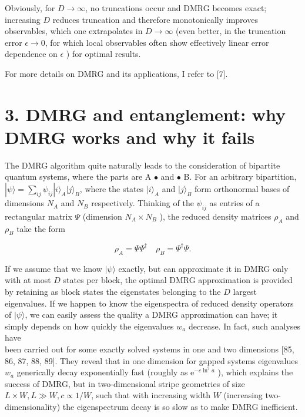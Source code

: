 \documentclass[12pt]{article}
\begin{document}
Obviously, for $D \rightarrow \infty$, no truncations occur and DMRG becomes exact; increasing $D$ reduces truncation and therefore monotonically improves observables, which one extrapolates in $D \rightarrow \infty$ (even better, in the truncation error $\epsilon \rightarrow 0$, for which local observables often show effectively linear error dependence on $\epsilon$ ) for optimal results.

For more details on DMRG and its applications, I refer to [7].

\section*{3. DMRG and entanglement: why DMRG works and why it fails}
The DMRG algorithm quite naturally leads to the consideration of bipartite quantum systems, where the parts are A $\bullet$ and $\bullet$ B. For an arbitrary bipartition, $|\psi\rangle=\sum_{i j} \psi_{i j}|i\rangle_{A}|j\rangle_{B}$, where the states $|i\rangle_{A}$ and $|j\rangle_{B}$ form orthonormal bases of dimensions $N_{A}$ and $N_{B}$ respectively. Thinking of the $\psi_{i j}$ as entries of a rectangular matrix $\Psi$ (dimension $N_{A} \times N_{B}$ ), the reduced density matrices $\rho_{A}$ and $\rho_{B}$ take the form


\begin{equation*}
\rho_{A}=\Psi \Psi^{\dagger} \quad \rho_{B}=\Psi^{\dagger} \Psi . \tag{16}
\end{equation*}


If we assume that we know $|\psi\rangle$ exactly, but can approximate it in DMRG only with at most $D$ states per block, the optimal DMRG approximation is provided by retaining as block states the eigenstates belonging to the $D$ largest eigenvalues. If we happen to know the eigenspectra of reduced density operators of $|\psi\rangle$, we can easily assess the quality a DMRG approximation can have; it simply depends on how quickly the eigenvalues $w_{a}$ decrease. In fact, such analyses have\\
been carried out for some exactly solved systems in one and two dimensions [85, 86, 87, 88, 89]. They reveal that in one dimension for gapped systems eigenvalues $w_{a}$ generically decay exponentially fast (roughly as $\mathrm{e}^{-c \ln ^{2} a}$ ), which explains the success of DMRG, but in two-dimensional stripe geometries of size $L \times W, L \gg W, c \propto 1 / W$, such that with increasing width $W$ (increasing two-dimensionality) the eigenspectrum decay is so slow as to make DMRG inefficient.
\end{document}
